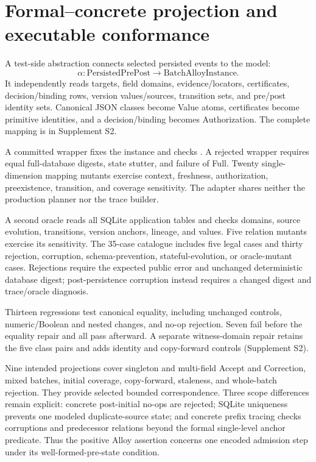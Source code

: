 \section{Formal--concrete projection and executable conformance}
\label{sec:conformance}

A test-side abstraction connects selected persisted events to the model:
\begin{equation}
\alpha:\mathrm{PersistedPrePost}\rightarrow\mathrm{BatchAlloyInstance}.
\end{equation}
It independently reads targets, field domains, evidence/locators, certificates, decision/binding rows, version values/sources, transition sets, and pre/post identity sets. Canonical JSON classes become Value atoms, certificates become primitive identities, and a decision/binding becomes Authorization. The complete mapping is in Supplement S2.

A committed wrapper fixes the instance and checks . A rejected wrapper requires equal full-database digests, state stutter, and failure of Full. Twenty single-dimension mapping mutants exercise context, freshness, authorization, preexistence, transition, and coverage sensitivity. The adapter shares neither the production planner nor the trace builder.

A second oracle reads all SQLite application tables and checks domains, source evolution, transitions, version anchors, lineage, and values. Five relation mutants exercise its sensitivity. The 35-case catalogue includes five legal cases and thirty rejection, corruption, schema-prevention, stateful-evolution, or oracle-mutant cases. Rejections require the expected public error and unchanged deterministic database digest; post-persistence corruption instead requires a changed digest and trace/oracle diagnosis.

Thirteen regressions test canonical equality, including unchanged controls, numeric/Boolean and nested changes, and no-op rejection. Seven fail before the equality repair and all pass afterward. A separate witness-domain repair retains the five class pairs and adds identity and copy-forward controls (Supplement S2).

Nine intended projections cover singleton and multi-field Accept and Correction, mixed batches, initial coverage, copy-forward, staleness, and whole-batch rejection. They provide selected bounded correspondence. Three scope differences remain explicit: concrete post-initial no-ops are rejected; SQLite uniqueness prevents one modeled duplicate-source state; and concrete prefix tracing checks corruptions and predecessor relations beyond the formal single-level anchor predicate. Thus the positive Alloy assertion concerns one encoded admission step under its well-formed-pre-state condition.
